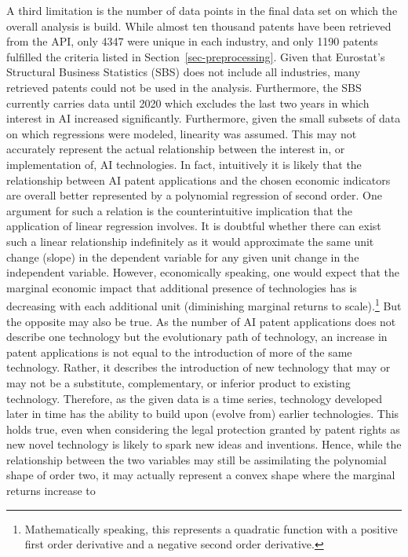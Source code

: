 \documentclass[
  12pt,
  a4paperpaper,
]{article}
\begin{document}
A third limitation is the number of data points in the final data set on
which the overall analysis is build. While almost ten thousand patents
have been retrieved from the API, only 4347 were unique in each
industry, and only 1190 patents fulfilled the criteria listed in
 Section~\ref{sec-preprocessing}. Given that
Eurostat's Structural Business Statistics (SBS) does not include all
industries, many retrieved patents could not be used in the analysis.
Furthermore, the SBS currently carries data until 2020 which excludes
the last two years in which interest in AI increased significantly.
Furthermore, given the small subsets of data on which regressions were
modeled, linearity was assumed. This may not accurately represent the
actual relationship between the interest in, or implementation of, AI
technologies. In fact, intuitively it is likely that the relationship
between AI patent applications and the chosen economic indicators are
overall better represented by a polynomial regression of second order.
One argument for such a relation is the counterintuitive implication
that the application of linear regression involves. It is doubtful
whether there can exist such a linear relationship indefinitely as it
would approximate the same unit change (slope) in the dependent variable
for any given unit change in the independent variable. However,
economically speaking, one would expect that the marginal economic
impact that additional presence of technologies has is decreasing with
each additional unit (diminishing marginal returns to scale).\footnote{Mathematically
  speaking, this represents a quadratic function with a positive first
  order derivative and a negative second order derivative.} But the
opposite may also be true. As the number of AI patent applications does
not describe one technology but the evolutionary path of technology, an
increase in patent applications is not equal to the introduction of more
of the same technology. Rather, it describes the introduction of new
technology that may or may not be a substitute, complementary, or
inferior product to existing technology. Therefore, as the given data is
a time series, technology developed later in time has the ability to
build upon (evolve from) earlier technologies. This holds true, even
when considering the legal protection granted by patent rights as new
novel technology is likely to spark new ideas and inventions. Hence,
while the relationship between the two variables may still be
assimilating the polynomial shape of order two, it may actually
represent a convex shape where the marginal returns increase to
\end{document}
